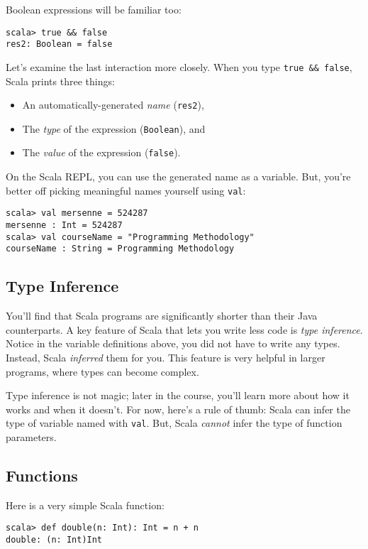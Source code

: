 \documentclass{book}
\begin{document}
Boolean expressions will be familiar too:

\begin{verbatim}
scala> true && false
res2: Boolean = false
\end{verbatim}

Let's examine the last interaction more closely. When you type \verb|true && false|,
Scala prints three things:
%
\begin{itemize}
\item An automatically-generated \emph{name} (\verb|res2|),
\item The \emph{type} of the expression (\verb|Boolean|), and
\item The \emph{value} of the expression (\verb|false|).
\end{itemize}

On the Scala REPL, you can use the generated name as a variable. But, you're
better off picking meaningful names yourself using \verb|val|:

\begin{verbatim}
scala> val mersenne = 524287
mersenne : Int = 524287
scala> val courseName = "Programming Methodology"
courseName : String = Programming Methodology
\end{verbatim}

\subsection{Type Inference}

You'll find that Scala programs are significantly shorter than their Java
counterparts. A key feature of Scala that lets you write less code is \emph{type
inference}. Notice in the variable definitions above, you did not have to write
any types. Instead, Scala \emph{inferred} them for you. This feature is very helpful
in larger programs, where types can become complex.

Type inference is not magic; later in the course, you'll learn more about how it
works and when it doesn't. For now, here's a rule of thumb: Scala can infer the
type of variable named with \verb|val|. But, Scala \emph{cannot} infer the type of
function parameters.

\subsection{Functions}

Here is a very simple Scala function:

\begin{verbatim}
scala> def double(n: Int): Int = n + n
double: (n: Int)Int
\end{verbatim}
\end{document}
